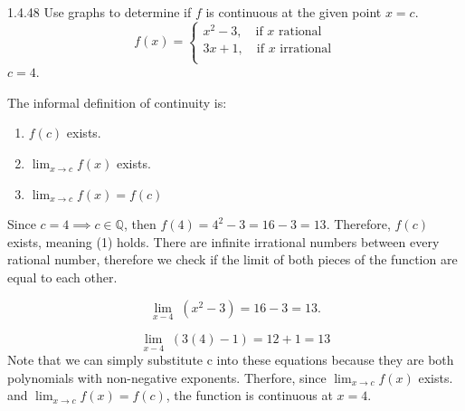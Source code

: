 \documentclass[]{article}
\begin{document}
\begin{question}{1.4.48}
    Use graphs to determine if $f$ is continuous at the given point $x = c$.
    \[
        f(x) = \begin{cases*}
            x^2-3, \quad \text{if } x \text{ rational} \\
            3x+1, \quad \text{if } x \text{ irrational} \\
        \end{cases*}
    \]
    $c = 4$.
\end{question}
The informal definition of continuity is:
\begin{center}
    \begin{enumerate}[label=(\arabic*)]
        \item $f(c)$ exists.
        \item $\displaystyle \lim_{x\rightarrow c} f(x)$ exists.
        \item $\displaystyle \lim_{x\rightarrow c} f(x) = f(c)$
    \end{enumerate}
\end{center}

Since $c = 4 \implies c \in \mathbb{Q}$, then $f(4) = 4^2 - 3 = 16 - 3 = 13.$
Therefore, $f(c)$ exists, meaning (1) holds.
\medbreak
There are infinite irrational numbers between every rational number, therefore
we check if the limit of both pieces of the function are equal to each other. 

\[
    \lim_{x-4}\;(x^2 - 3) = 16-3 = 13.
\]

\[
    \lim_{x-4}\; (3(4) - 1) = 12+1 = 13
\]
Note that we can simply substitute c into these equations because they are both polynomials with non-negative
exponents.
\medbreak
Therfore, since $\displaystyle \lim_{x\rightarrow c} f(x)$ exists. and 
$\displaystyle \lim_{x\rightarrow c} f(x) = f(c)$, the function is continuous at 
$x = 4$.
\begin{center}
\end{center}
\end{document}
